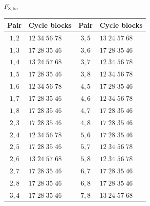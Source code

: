 \documentclass[11pt,a4paper]{article}
\theoremstyle{plain}
\theoremstyle{definition}
\numberwithin{equation}{section}
\begin{document}
\begingroup\setlength{\topsep}{3pt}\setlength{\partopsep}{0pt}\setlength{\parskip}{0pt}
\begin{center}\small
$F_{8,5a}$\par\nopagebreak[4]\smallskip\nopagebreak[4]
\begin{tabular}{cl@{\qquad}cl}\toprule Pair&Cycle blocks&Pair&Cycle blocks\\\midrule
$1,2$ & $12\;34\;56\;78$ & $3,5$ & $13\;24\;57\;68$ \\
$1,3$ & $17\;28\;35\;46$ & $3,6$ & $17\;28\;35\;46$ \\
$1,4$ & $13\;24\;57\;68$ & $3,7$ & $12\;34\;56\;78$ \\
$1,5$ & $17\;28\;35\;46$ & $3,8$ & $12\;34\;56\;78$ \\
$1,6$ & $12\;34\;56\;78$ & $4,5$ & $17\;28\;35\;46$ \\
$1,7$ & $17\;28\;35\;46$ & $4,6$ & $12\;34\;56\;78$ \\
$1,8$ & $17\;28\;35\;46$ & $4,7$ & $17\;28\;35\;46$ \\
$2,3$ & $17\;28\;35\;46$ & $4,8$ & $17\;28\;35\;46$ \\
$2,4$ & $12\;34\;56\;78$ & $5,6$ & $17\;28\;35\;46$ \\
$2,5$ & $17\;28\;35\;46$ & $5,7$ & $12\;34\;56\;78$ \\
$2,6$ & $13\;24\;57\;68$ & $5,8$ & $12\;34\;56\;78$ \\
$2,7$ & $17\;28\;35\;46$ & $6,7$ & $17\;28\;35\;46$ \\
$2,8$ & $17\;28\;35\;46$ & $6,8$ & $17\;28\;35\;46$ \\
$3,4$ & $17\;28\;35\;46$ & $7,8$ & $13\;24\;57\;68$ \\
\bottomrule\end{tabular}
\end{center}
\end{document}

